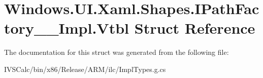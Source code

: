 \hypertarget{struct_windows_1_1_u_i_1_1_xaml_1_1_shapes_1_1_i_path_factory_____impl_1_1_vtbl}{}\section{Windows.\+U\+I.\+Xaml.\+Shapes.\+I\+Path\+Factory\+\_\+\+\_\+\+Impl.\+Vtbl Struct Reference}
\label{struct_windows_1_1_u_i_1_1_xaml_1_1_shapes_1_1_i_path_factory_____impl_1_1_vtbl}


The documentation for this struct was generated from the following file\+:\begin{DoxyCompactItemize}
\item 
I\+V\+S\+Calc/bin/x86/\+Release/\+A\+R\+M/ilc/Impl\+Types.\+g.\+cs\end{DoxyCompactItemize}
